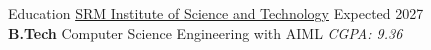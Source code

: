 \documentclass{resume} %
\begin{document}















\begin{rSection}{Education}
    \href{https://www.linkedin.com/school/s.r.m.-institute-of-science-&-technology-chennai/}{SRM Institute of Science and Technology} \hfill Expected 2027\\
\textbf{B.Tech} Computer Science Engineering with AIML \hfill \textit{CGPA: 9.36}
\end{rSection}
\end{document}

